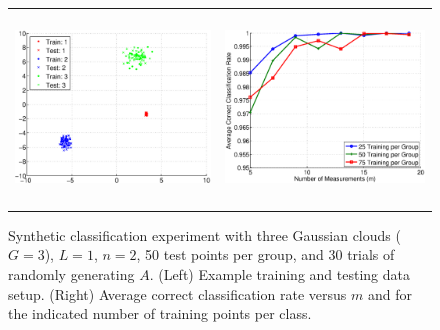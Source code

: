 \documentclass[twoside,11pt]{article}
\begin{document}
\begin{figure}[!htbp]
\centering
\begin{tabular}{cc}
\includegraphics[height=2in]{images/Synthetic/gaussian_g3_d2/synthetic_1a.eps} &
\includegraphics[height=2in]{images/Synthetic/gaussian_g3_d2/synthetic_1b.eps} \\
\end{tabular}
\caption{Synthetic classification experiment with three Gaussian clouds ($G=3$), $L=1$, $n=2$, 50 test points per group, and 30 trials of randomly generating $A$. (Left) Example training and testing data setup. (Right) Average correct classification rate versus $m$ and for the indicated number of training points per class.}
\label{syn:gaussian clouds}
\end{figure}
\end{document}

